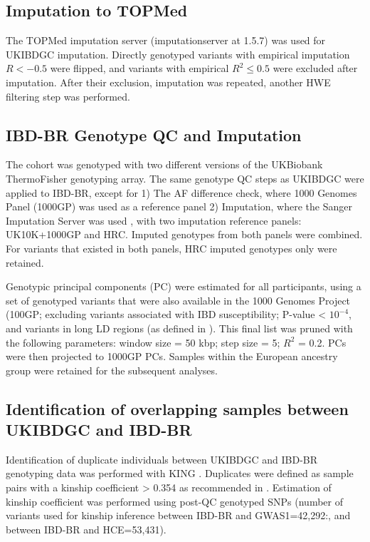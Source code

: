 \subsection{Imputation to TOPMed}
The TOPMed imputation server (imputationserver at 1.5.7) was used for UKIBDGC imputation. Directly genotyped variants with empirical imputation $R < -0.5$ were flipped, and variants with empirical $R^{2} \leq 0.5$ were excluded after imputation. After their exclusion, imputation was repeated, another HWE filtering step was performed.

\subsection{IBD-BR Genotype QC and Imputation}
The cohort was genotyped with two different versions of the UKBiobank ThermoFisher genotyping array. The same genotype QC steps as UKIBDGC were applied to IBD-BR, except for 1) The AF difference check, where 1000 Genomes Panel (1000GP) was used as a reference panel 2) Imputation, where the Sanger Imputation Server was used \cite{1000gp}, with two imputation reference panels: UK10K+1000GP and HRC. Imputed genotypes from both panels were combined. For variants that existed in both panels, HRC imputed genotypes only were retained. 

Genotypic principal components (PC) were estimated for all participants, using a set of genotyped variants that were also available in the 1000 Genomes Project (100GP; excluding variants associated with IBD susceptibility; P-value < $10^{-4}$, and variants in long LD regions (as defined in \cite{plink_high_ld}). This final list was pruned with the following parameters: window size = 50 kbp; step size = 5; $R^{2}$ = 0.2. PCs were then projected to 1000GP PCs. Samples within the European ancestry group were retained for the subsequent analyses. 

\subsection{Identification of overlapping samples between UKIBDGC and IBD-BR}
Identification of duplicate individuals between UKIBDGC and IBD-BR genotyping data was performed with KING \cite{king-software}. Duplicates were defined as sample pairs with a kinship coefficient > 0.354 as recommended in \cite{king-software}. Estimation of kinship coefficient was performed using post-QC genotyped SNPs (number of variants used for kinship inference between IBD-BR and GWAS1=42,292:, and between IBD-BR and HCE=53,431).

